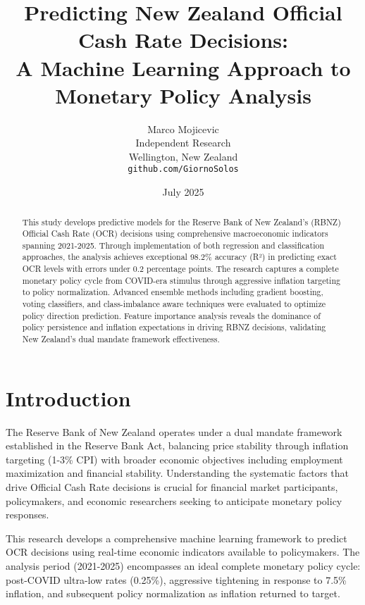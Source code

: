 \documentclass[11pt,a4paper]{article}
\title{Predicting New Zealand Official Cash Rate Decisions: \\
	A Machine Learning Approach to Monetary Policy Analysis}
\author{Marco Mojicevic \\
	Independent Research \\
	Wellington, New Zealand \\
	\texttt{github.com/GiornoSolos}}
\date{July 2025}
\begin{document}
	
	\maketitle
	
	\begin{abstract}
		This study develops predictive models for the Reserve Bank of New Zealand's (RBNZ) Official Cash Rate (OCR) decisions using comprehensive macroeconomic indicators spanning 2021-2025. Through implementation of both regression and classification approaches, the analysis achieves exceptional 98.2\% accuracy (R²) in predicting exact OCR levels with errors under 0.2 percentage points. The research captures a complete monetary policy cycle from COVID-era stimulus through aggressive inflation targeting to policy normalization. Advanced ensemble methods including gradient boosting, voting classifiers, and class-imbalance aware techniques were evaluated to optimize policy direction prediction. Feature importance analysis reveals the dominance of policy persistence and inflation expectations in driving RBNZ decisions, validating New Zealand's dual mandate framework effectiveness.
	\end{abstract}
	
	\section{Introduction}
	
	The Reserve Bank of New Zealand operates under a dual mandate framework established in the Reserve Bank Act, balancing price stability through inflation targeting (1-3\% CPI) with broader economic objectives including employment maximization and financial stability. Understanding the systematic factors that drive Official Cash Rate decisions is crucial for financial market participants, policymakers, and economic researchers seeking to anticipate monetary policy responses.
	
	This research develops a comprehensive machine learning framework to predict OCR decisions using real-time economic indicators available to policymakers. The analysis period (2021-2025) encompasses an ideal complete monetary policy cycle: post-COVID ultra-low rates (0.25\%), aggressive tightening in response to 7.5\% inflation, and subsequent policy normalization as inflation returned to target.
	
\end{document}
